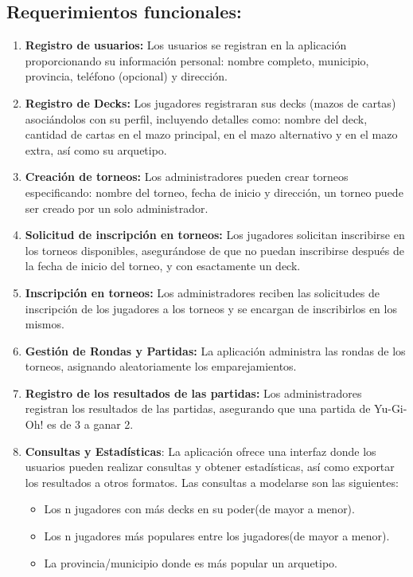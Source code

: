 \documentclass[a4paper]{article}
\begin{document}
\subsection{Requerimientos funcionales:}
\begin{enumerate}
	\item \textbf{Registro de usuarios:} Los usuarios se registran en la aplicación proporcionando su información personal: nombre completo, municipio, provincia, teléfono (opcional) y dirección.
	\item \textbf{Registro de Decks:} Los jugadores registraran sus decks (mazos de cartas) asoci\'andolos con su perfil, incluyendo detalles como: nombre del deck, cantidad de cartas en el mazo principal, en el mazo alternativo y en el mazo extra, así como su arquetipo.
	\item \textbf{Creaci\'on de torneos:} Los administradores pueden crear torneos especificando: nombre del torneo, fecha de inicio y dirección, un torneo puede ser creado por un solo administrador.
	\item \textbf{Solicitud de inscripci\'on en torneos:} Los jugadores solicitan inscribirse en los torneos disponibles, asegur\'andose de que no puedan inscribirse despu\'es de la fecha de inicio del torneo, y con esactamente un deck. 
	\item \textbf{Inscripci\'on en torneos:} Los administradores reciben las solicitudes de inscripci\'on de los jugadores a los torneos y se encargan de inscribirlos en los mismos.
    \item \textbf{Gestión de Rondas y Partidas:} La aplicaci\'on administra las rondas de los torneos, asignando aleatoriamente los emparejamientos.
    \item \textbf{Registro de los resultados de las partidas:} Los administradores registran los resultados de las partidas, asegurando que una partida de Yu-Gi-Oh! es de 3 a ganar 2.
    \item \textbf{Consultas y Estad\'isticas}: La aplicaci\'on ofrece una interfaz donde los usuarios pueden realizar consultas y obtener estad\'isticas, as\'i como exportar los resultados a otros formatos. Las consultas a modelarse son las siguientes:
    \begin{itemize}
    \item Los n jugadores con m\'as decks en su poder(de mayor a menor).
    \item Los n jugadores m\'as populares entre los jugadores(de mayor a menor).
    \item La provincia/municipio donde es m\'as popular un arquetipo.

\end{itemize}
\end{enumerate}
\end{document}
